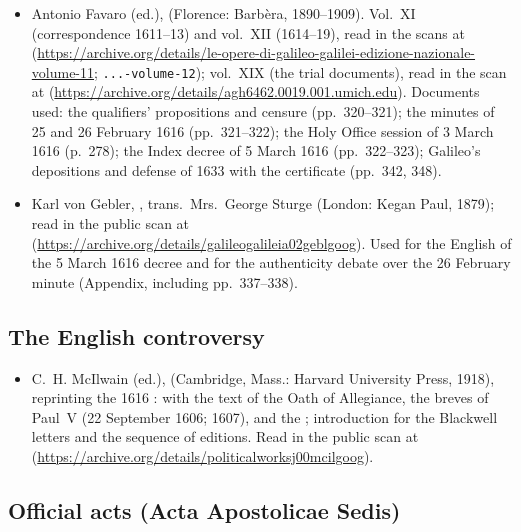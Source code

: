 \begin{itemize}
\item Antonio Favaro (ed.),  (Florence: Barb\`era, 1890--1909). Vol.~XI
(correspondence 1611--13) and vol.~XII (1614--19), read in the
scans at
(\url{https://archive.org/details/le-opere-di-galileo-galilei-edizione-nazionale-volume-11};
\texttt{...-volume-12}); vol.~XIX (the trial documents), read in
the scan at
(\url{https://archive.org/details/agh6462.0019.001.umich.edu}).
Documents used: the qualifiers' propositions and censure
(pp.~320--321); the minutes of 25 and 26 February 1616
(pp.~321--322); the Holy Office session of 3 March 1616 (p.~278);
the Index decree of 5 March 1616 (pp.~322--323); Galileo's
depositions and defense of 1633 with the certificate (pp.~342,
348).
\item Karl von Gebler, ,
trans.\ Mrs.~George Sturge (London: Kegan Paul, 1879); read in the
public scan at
(\url{https://archive.org/details/galileogalileia02geblgoog}).
Used for the English of the 5 March 1616 decree and for the
authenticity debate over the 26 February minute (Appendix,
including pp.~337--338).
\end{itemize}

\subsection*{The English controversy}

\begin{itemize}
\item C.~H. McIlwain (ed.), 
(Cambridge, Mass.: Harvard University Press, 1918), reprinting the
1616 :  with the
text of the Oath of Allegiance, the breves of Paul~V (22 September
1606; 1607), and the ; introduction for the
Blackwell letters and the sequence of editions. Read in the public
scan at
(\url{https://archive.org/details/politicalworksj00mcilgoog}).
\end{itemize}

\subsection*{Official acts (Acta Apostolicae Sedis)}

